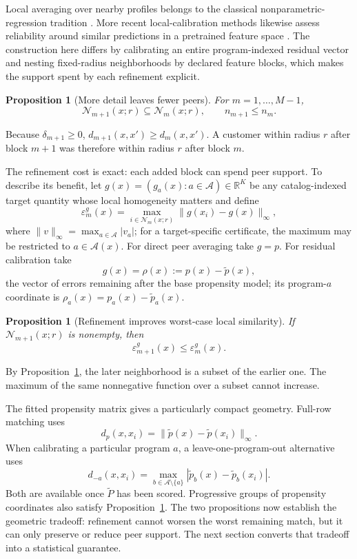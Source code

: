 \documentclass[11pt]{article}
\makeatletter
\theoremstyle{noteplain}
\newtheorem{proposition}[theorem]{Proposition}
\theoremstyle{definition}
\renewenvironment{proof}[1][\proofname]{\par
  \pushQED{\qed}%
  \normalfont \topsep5\p@\@plus5\p@\relax
  \trivlist
  \item[\hskip\labelsep\bfseries #1\@addpunct{.}]\ignorespaces
}{%
  \popQED\endtrivlist\@endpefalse
}
\newcommand{\cA}{\mathcal A}
\newcommand{\cN}{\mathcal N}
\makeatother
\begin{document}
Local averaging over nearby profiles belongs to the classical nonparametric-regression tradition \cite{stone}. More recent local-calibration methods likewise assess reliability around similar predictions in a pretrained feature space \cite{luo}. The construction here differs by calibrating an entire program-indexed residual vector and nesting fixed-radius neighborhoods by declared feature blocks, which makes the support spent by each refinement explicit.

\begin{proposition}[More detail leaves fewer peers]\label{prop:thin}
For $m=1,\ldots,M-1$,
\[
 \cN_{m+1}(x;r)\subseteq\cN_m(x;r),\qquad n_{m+1}\leq n_m.
\]
\end{proposition}

\begin{proof}
Because $\delta_{m+1}\geq0$, $d_{m+1}(x,x')\geq d_m(x,x')$. A customer within radius $r$ after block $m+1$ was therefore within radius $r$ after block $m$.
\end{proof}

The refinement cost is exact: each added block can spend peer support. To describe its benefit, let $g(x)=(g_a(x):a\in\cA)\in\mathbb R^K$ be any catalog-indexed target quantity whose local homogeneity matters and define
\[
 \varepsilon_m^g(x)=\max_{i\in\cN_m(x;r)}\|g(x_i)-g(x)\|_\infty,
\]
where $\|v\|_\infty=\max_{a\in\cA}|v_a|$; for a target-specific certificate, the maximum may be restricted to $a\in\cA(x)$. For direct peer averaging take $g=p$. For residual calibration take
\[
 g(x)=\rho(x):=p(x)-\widetilde p(x),
\]
the vector of errors remaining after the base propensity model; its program-$a$ coordinate is $\rho_a(x)=p_a(x)-\widetilde p_a(x)$.

\begin{proposition}[Refinement improves worst-case local similarity]\label{prop:mismatch}
If $\cN_{m+1}(x;r)$ is nonempty, then
\[
 \varepsilon_{m+1}^g(x)\leq\varepsilon_m^g(x).
\]
\end{proposition}

\begin{proof}
By Proposition~\ref{prop:thin}, the later neighborhood is a subset of the earlier one. The maximum of the same nonnegative function over a subset cannot increase.
\end{proof}

The fitted propensity matrix gives a particularly compact geometry. Full-row matching uses
\[
 d_p(x,x_i)=\|\widetilde p(x)-\widetilde p(x_i)\|_\infty.
\]
When calibrating a particular program $a$, a leave-one-program-out alternative uses
\[
 d_{-a}(x,x_i)=\max_{b\in\cA\setminus\{a\}}
 |\widetilde p_b(x)-\widetilde p_b(x_i)|.
\]
Both are available once $\widetilde P$ has been scored. Progressive groups of propensity coordinates also satisfy Proposition~\ref{prop:thin}. The two propositions now establish the geometric tradeoff: refinement cannot worsen the worst remaining match, but it can only preserve or reduce peer support. The next section converts that tradeoff into a statistical guarantee.
\end{document}
